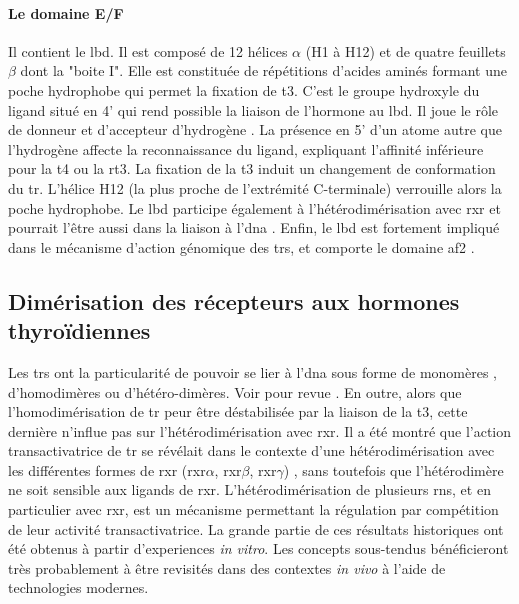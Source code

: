 \paragraph{Le domaine E/F}
Il contient le \gls{lbd}.
Il est composé de 12 hélices $\alpha$ (H1 à H12) et de quatre feuillets $\beta$ dont la "boite I".
Elle est constituée de répétitions d'acides aminés formant une poche hydrophobe qui permet la fixation de \gls{t3}.
C'est le groupe hydroxyle du ligand situé en 4' qui rend possible la liaison de l'hormone au \gls{lbd}.
Il joue le rôle de donneur et d’accepteur d’hydrogène \citep{Dietrich1977}.
La présence en 5' d'un atome autre que l'hydrogène affecte la reconnaissance du ligand, expliquant l'affinité inférieure pour la \gls{t4} ou la \gls{rt3}.
La fixation de la \gls{t3} induit un changement de conformation du \gls{tr}.
L'hélice H12 (la plus proche de l'extrémité C-terminale) verrouille alors la poche hydrophobe.
Le \gls{lbd} participe également à l'hétérodimérisation avec \gls{rxr} \citep{Wagner1995,Bain2007} et pourrait l'être aussi dans la liaison à l'\gls{dna} \citep{Figueira2010}.
Enfin, le \gls{lbd} est fortement impliqué dans le mécanisme d'action génomique des \glspl{tr}, et comporte le domaine \gls{af2} \citep{Barettino1994,Tone1994}.


\subsection{Dimérisation des récepteurs aux hormones thyroïdiennes}
Les \glspl{tr} ont la particularité de pouvoir se lier à l'\gls{dna} sous forme de monomères \citep{Schrader1994}, d'homodimères ou d'hétéro-dimères. Voir pour revue \citet{Ikeda1994}.
En outre, alors que l'homodimérisation de \gls{tr} peur être déstabilisée par la liaison de la \gls{t3}, cette dernière n'influe pas sur l'hétérodimérisation avec \gls{rxr}.
Il a été montré que l'action transactivatrice de \gls{tr} se révélait dans le contexte d'une hétérodimérisation avec les différentes formes de \gls{rxr} (\gls{rxr}$\alpha$, \gls{rxr}$\beta$, \gls{rxr}$\gamma$) \citep{Umesono1988a,Mangelsdorf1990,Kliewer1992,Zhang1992}, sans toutefois que l'hétérodimère ne soit sensible aux ligands de \gls{rxr}.
L'hétérodimérisation de plusieurs \glspl{rn}, et en particulier avec \gls{rxr}, est un mécanisme permettant la régulation par compétition de leur activité transactivatrice.
La grande partie de ces résultats historiques ont été obtenus à partir d'experiences \textit{in vitro}.
Les concepts sous-tendus bénéficieront très probablement à être revisités dans des contextes \textit{in vivo} à l'aide de technologies modernes.

